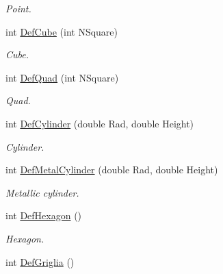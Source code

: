 \begin{DoxyCompactItemize}
\begin{DoxyCompactList}\small\item\em \-Point. \end{DoxyCompactList}\item 
\hypertarget{classDraw_a0ab1b8899eb5e75e63634120f152d532}{int \hyperlink{classDraw_a0ab1b8899eb5e75e63634120f152d532}{\-Def\-Cube} (int \-N\-Square)}\label{classDraw_a0ab1b8899eb5e75e63634120f152d532}

\begin{DoxyCompactList}\small\item\em \-Cube. \end{DoxyCompactList}\item 
\hypertarget{classDraw_a7e12d94e8036fd5222db58072fe8a4c1}{int \hyperlink{classDraw_a7e12d94e8036fd5222db58072fe8a4c1}{\-Def\-Quad} (int \-N\-Square)}\label{classDraw_a7e12d94e8036fd5222db58072fe8a4c1}

\begin{DoxyCompactList}\small\item\em \-Quad. \end{DoxyCompactList}\item 
\hypertarget{classDraw_af4ca54f4f60c7e6b3e44f81a82afa810}{int \hyperlink{classDraw_af4ca54f4f60c7e6b3e44f81a82afa810}{\-Def\-Cylinder} (double \-Rad, double \-Height)}\label{classDraw_af4ca54f4f60c7e6b3e44f81a82afa810}

\begin{DoxyCompactList}\small\item\em \-Cylinder. \end{DoxyCompactList}\item 
\hypertarget{classDraw_a48bd0a016aeca0bc3c42ddfbe4597bdc}{int \hyperlink{classDraw_a48bd0a016aeca0bc3c42ddfbe4597bdc}{\-Def\-Metal\-Cylinder} (double \-Rad, double \-Height)}\label{classDraw_a48bd0a016aeca0bc3c42ddfbe4597bdc}

\begin{DoxyCompactList}\small\item\em \-Metallic cylinder. \end{DoxyCompactList}\item 
\hypertarget{classDraw_a57d5c994950e11fb7e58680393213343}{int \hyperlink{classDraw_a57d5c994950e11fb7e58680393213343}{\-Def\-Hexagon} ()}\label{classDraw_a57d5c994950e11fb7e58680393213343}

\begin{DoxyCompactList}\small\item\em \-Hexagon. \end{DoxyCompactList}\item 
\hypertarget{classDraw_adec17f3a83b10efe43dee2808cc57194}{int \hyperlink{classDraw_adec17f3a83b10efe43dee2808cc57194}{\-Def\-Griglia} ()}\label{classDraw_adec17f3a83b10efe43dee2808cc57194}


\end{DoxyCompactItemize}
